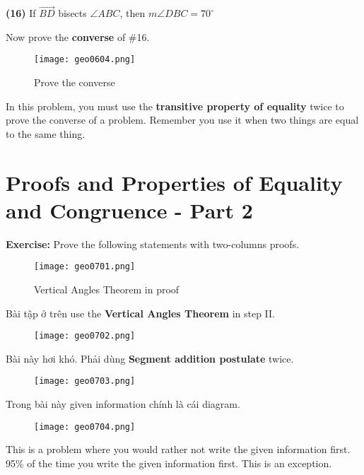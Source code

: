 \textbf{(16)} If $\overrightarrow{BD}$ bisects $\angle ABC$, then $m\angle DBC=70^{\circ}$

Now prove the \textbf{converse} of \#16.

\newpage

\begin{figure}[htb!]
  \centering
  \texttt{[image: geo0604.png]}
  \caption{Prove the converse}
\end{figure}

In this problem, you must use the \textbf{transitive property of equality} twice to prove the converse of a problem. Remember you use it when two things are equal to the same thing.

\section{Proofs and Properties of Equality and Congruence - Part 2}

\textbf{Exercise:} Prove the following statements with two-columns proofs.

\newpage

\begin{figure}[htb!]
  \centering
  \texttt{[image: geo0701.png]}
  \caption{Vertical Angles Theorem in proof}
\end{figure}

Bài tập ở trên use the \textbf{Vertical Angles Theorem} in step II.

\begin{figure}[htb!]
  \centering
  \texttt{[image: geo0702.png]}
\end{figure}

Bài này hơi khó. Phải dùng \textbf{Segment addition postulate} twice.

\newpage

\begin{figure}[htb!]
  \centering
  \texttt{[image: geo0703.png]}
\end{figure}

Trong bài này given information chính là cái diagram.

\begin{figure}[htb!]
  \centering
  \texttt{[image: geo0704.png]}
\end{figure}

This is a problem where you would rather not write the given information first. 95\% of the time you write the given information first. This is an exception.


